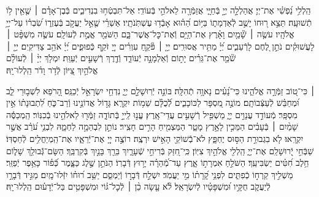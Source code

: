 \documentclass[twoside, openany, parskip=half, 11pt]{book}
\begin{document}
הַֽלְלִ֥י נַ֝פְשִׁ֗י אֶת־יְיָ׃
אֲהַלְלָ֣ה יְיָ֣ בְּֿחַיָּ֑י אֲזַמְּֿרָ֖ה לֵאלֹהַ֣י בְּֿעוֹדִֽי׃
אַל־תִּבְטְֿח֥וּ בִנְדִיבִ֑ים בְּֿבֶן־אָדָ֓ם ׀ שֶׁ֤אֵ֖ין ל֥וֹ תְֿשׁוּעָֽה׃ 
תֵּצֵ֣א ר֭וּחוֹ יָשֻׁ֣ב לְֿאַדְמָת֑וֹ בַּיּ֥וֹם הַ֝ה֗וּא אָבְֿד֥וּ עֶשְׁתֹּֽנֹתָֽיו׃ 
אַשְׁרֵ֗י שֶׁ֤אֵ֣ל יַעֲקֹ֣ב בְּֿעֶזְר֑וֹ שִׂ֝בְר֗וֹ עַל־יְיָ֥ אֱלֹהָֽיו׃ 
עֹשֶׂ֤ה ׀ שָׁ֘מַ֤יִם וָאָ֗רֶץ אֶת־הַיָּ֥ם וְֿאֶת־כׇּל־אֲשֶׁר־בָּ֑ם  הַשֹּׁמֵ֖ר אֱמֶ֣ת לְֿעוֹלָֽם׃
עֹשֶׂ֤ה מִשְׁפָּ֨ט ׀ לָעֲשׁוּקִ֗ים נֹתֵ֣ן לֶ֭חֶם לָרְֿעֵבִ֑ים יְ֝יָ֗ מַתִּ֥יר אֲסוּרִֽים׃ 
יְיָ֤ ׀ פֹּ֘קֵ֤חַ עִוְרִ֗ים יְיָ֭ זֹקֵ֣ף כְּֿפוּפִ֑ים יְ֝יָ֗ אֹהֵ֥ב צַדִּיקִֽים׃
יְיָ֤ ׀ שֹׁ֘מֵ֤ר אֶת־גֵּרִ֗ים יָת֣וֹם וְֿאַלְמָנָ֣ה יְֿעוֹדֵ֑ד וְֿדֶ֖רֶךְ רְֿשָׁעִ֣ים יְֿעַוֵּֽת׃
יִמְלֹ֤ךְ יְיָ֨ ׀ לְֿעוֹלָ֗ם\\ אֱלֹהַ֣יִךְ צִ֭יּוֹן לְֿדֹ֥ר וָדֹ֗ר הַֽלְלוּ־יָֽהּ׃



 ׀
כִּי־ט֭וֹב זַמְּֿרָ֣ה אֱלֹהֵ֑ינוּ כִּי־נָ֝עִ֗ים נָאוָ֥ה תְֿהִלָּֽה׃
בּוֹנֵ֣ה יְֿרֽוּשָׁלַ֣‍ִם יְיָ֑ נִדְחֵ֖י יִשְׂרָאֵ֣ל יְֿכַנֵּֽס׃
הָ֭רֹפֵא לִשְׁב֣וּרֵי לֵ֑ב וּ֝מְחַבֵּ֗שׁ לְֿעַצְּֿבוֹתָֽם׃
מוֹנֶ֣ה מִ֭סְפָּר לַכּוֹכָבִ֑ים לְֿ֝כֻלָּ֗ם שֵׁמ֥וֹת יִקְרָֽא׃
גָּד֣וֹל אֲדוֹנֵ֣ינוּ וְֿרַב־כֹּ֑חַ  לִ֝תְבוּנָת֗וֹ אֵ֣ין מִסְפָּֽר׃ 
מְֿעוֹדֵ֣ד עֲנָוִ֣ים יְיָ֑  מַשְׁפִּ֖יל רְֿשָׁעִ֣ים עֲדֵי־אָֽרֶץ׃
עֱנ֣וּ לַֽייָ֣ בְּֿתוֹדָ֑ה  זַמְּֿר֖וּ לֵאלֹהֵ֣ינוּ בְֿכִנּֽוֹר׃
הַֽמְכַסֶּ֬ה שָׁמַ֨יִם ׀ בְּֿעָבִ֗ים  הַמֵּכִ֣ין לָאָ֣רֶץ מָטָ֑ר הַמַּצְמִ֖יחַ הָרִ֣ים חָצִֽיר׃
נוֹתֵ֣ן לִבְהֵמָ֣ה לַחְמָ֑הּ לִבְנֵ֥י עֹ֝רֵ֗ב אֲשֶׁ֣ר יִקְרָֽאוּ׃
לֹ֤א בִגְבוּרַ֣ת הַסּ֣וּס יֶחְפָּ֑ץ  לֹא־בְֿֿשׁוֹקֵ֖י הָאִ֣ישׁ יִרְצֶֽה׃
רוֹצֶ֣ה יְיָ֭ אֶת־יְֿרֵאָ֑יו אֶת־הַֽמְיַחֲלִ֥ים לְֿחַסְדּֽוֹ׃
שַׁבְּֿחִ֣י יְֿ֭רוּשָׁלַ‍ִם אֶת־יְיָ֑ הַֽלְלִ֖י אֱלֹהַ֣יִךְ צִיּֽוֹן׃
כִּֽי־חִ֭זַּק בְּֿרִיחֵ֣י שְֿׁעָרָ֑יִךְ בֵּרַ֖ךְ בָּנַ֣יִךְ בְּֿקִרְבֵּֽךְ׃
הַשָּׂם־גְּֿֿבוּלֵ֥ךְ שָׁל֑וֹם חֵ֥לֶב חִ֝טִּ֗ים יַשְׂבִּיעֵֽךְ׃
הַשֹּׁלֵ֣חַ אִמְרָת֣וֹ אָ֑רֶץ עַד־מְֿ֝הֵרָ֗ה יָר֥וּץ דְּֿבָרֽוֹ׃
הַנֹּתֵ֣ן שֶׁ֣לֶג כַּצָּ֑מֶר כְּֿ֝פ֗וֹר כָּאֵ֥פֶר יְֿפַזֵּֽר׃
מַשְׁלִ֣יךְ קַֽרְח֣וֹ כְֿפִתִּ֑ים לִפְנֵ֥י קָ֝רָת֗וֹ מִ֣י יַעֲמֹֽד׃
יִשְׁלַ֣ח דְּֿבָר֣וֹ וְֿיַמְסֵ֑ם יַשֵּׁ֥ב ר֝וּח֗וֹ יִזְּֿלוּ־מָֽיִם׃
מַגִּ֣יד דְּֿבָרָ֣ו לְֿיַעֲקֹ֑ב חֻקָּ֥יו וּ֝מִשְׁפָּטָ֗יו לְֿיִשְׂרָאֵֽל׃
לֹ֘א עָ֤שָׂה כֵ֨ן ׀ לְֿכׇל־גּ֗וֹי וּמִשְׁפָּטִ֥ים בַּל־יְֿדָע֗וּם  הַֽלְלוּ־יָֽהּ׃
\end{document}
